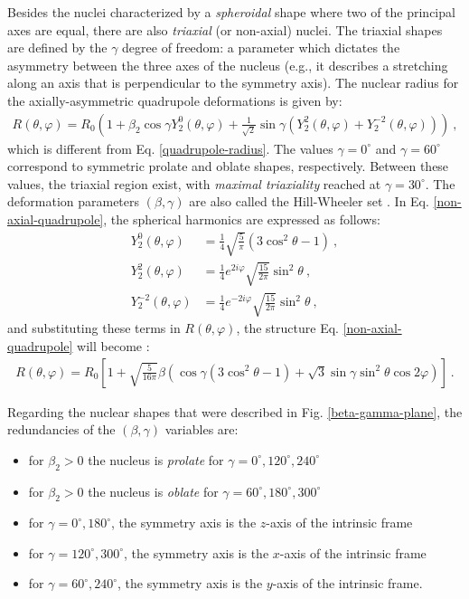 Besides the nuclei characterized by a \emph{spheroidal} shape where two of the principal axes are equal, there are also \emph{triaxial} (or non-axial) nuclei. The triaxial shapes are defined by the $\gamma$ degree of freedom: a parameter which dictates the asymmetry between the three axes of the nucleus (e.g., it describes a stretching along an axis that is perpendicular to the symmetry axis). The nuclear radius for the axially-asymmetric quadrupole deformations is given by:
\begin{align}
    R(\theta,\varphi)=R_0\left(1+\beta_2\cos\gamma Y_2^0(\theta,\varphi)+\frac{1}{\sqrt{2}}\sin\gamma(Y_2^2(\theta,\varphi)+Y_2^{-2}(\theta,\varphi))\right)\ ,
    \label{non-axial-quadrupole}
\end{align}
which is different from Eq. \eqref{quadrupole-radius}. The values $\gamma=0^\circ$ and $\gamma=60^\circ$ correspond to symmetric prolate and oblate shapes, respectively. Between these values, the triaxial region exist, with \emph{maximal triaxiality} reached at $\gamma=30^\circ$. The deformation parameters $(\beta,\gamma)$ are also called the Hill-Wheeler set \cite{wong2008introductory}. In Eq. \eqref{non-axial-quadrupole}, the spherical harmonics are expressed as follows:
\begin{align}
    Y_2^0(\theta,\varphi)&=\frac{1}{4}\sqrt{\frac{5}{\pi}}\left(3\cos^2\theta-1\right)\ , \nonumber\\
    Y_2^2(\theta,\varphi)&=\frac{1}{4}e^{2i\varphi}\sqrt{\frac{15}{2\pi}}\sin^2\theta\ ,\nonumber\\
    Y_2^{-2}(\theta,\varphi)&=\frac{1}{4}e^{-2i\varphi}\sqrt{\frac{15}{2\pi}}\sin^2\theta\ ,
\end{align}
and substituting these terms in $R(\theta,\varphi)$, the structure Eq. \eqref{non-axial-quadrupole} will become \cite{andersson1976nuclear,bohr1998nuclear}:
\begin{align}
    R(\theta,\varphi)=R_0\left[1+\sqrt{\frac{5}{16\pi}}\beta\left(\cos\gamma(3\cos^2\theta-1)+\sqrt{3}\sin\gamma\sin^2\theta\cos2\varphi\right)\right]\ .
\end{align}

Regarding the nuclear shapes that were described in Fig. \ref{beta-gamma-plane}, the redundancies of the $(\beta,\gamma)$ variables are:
\begin{itemize}
    \item for $\beta_2>0$ the nucleus is \emph{prolate} for $\gamma=0^\circ,120^\circ,240^\circ$
    \item for $\beta_2>0$ the nucleus is \emph{oblate} for $\gamma=60^\circ,180^\circ,300^\circ$
    \item for $\gamma=0^\circ,180^\circ$, the symmetry axis is the $z$-axis of the intrinsic frame
    \item for $\gamma=120^\circ,300^\circ$, the symmetry axis is the $x$-axis of the intrinsic frame
    \item for $\gamma=60^\circ,240^\circ$, the symmetry axis is the $y$-axis of the intrinsic frame.
\end{itemize}

